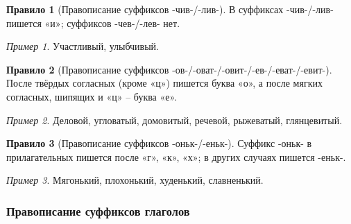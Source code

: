 \documentclass[12pt]{article}
\theoremstyle{definition}
\newtheorem{rrule}{Правило}[section]
\theoremstyle{remark}
\newtheorem*{example}{Пример}
\begin{document}
\begin{rrule}[Правописание суффиксов -чив-/-лив-]
    В суффиксах -чив-/-лив- пишется «и»; суффиксов -чев-/-лев- нет.
    \begin{example}
        Участливый, улыбчивый.
    \end{example}
\end{rrule}

\begin{rrule}[Правописание суффиксов -ов-/-оват-/-овит-/-ев-/-еват-/-евит-]
    После твёрдых согласных (кроме «ц») пишется буква «о», а после мягких согласных, шипящих и «ц» -- буква «е».
    \begin{example}
        Деловой, угловатый, домовитый, речевой, рыжеватый, глянцевитый.
    \end{example}
\end{rrule}

\begin{rrule}[Правописание суффиксов -оньк-/-еньк-]
    Суффикс -оньк- в прилагательных пишется после «г», «к», «х»; в других случаях пишется -еньк-.
    \begin{example}
        Мягонький, плохонький, худенький, славненький.
    \end{example}
\end{rrule}

\subsubsection{Правописание суффиксов глаголов}
\end{document}
